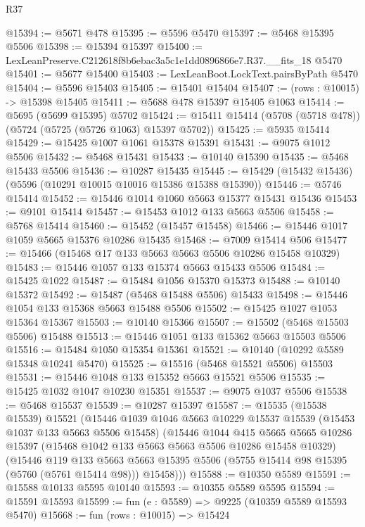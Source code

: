 \begin{lexlean}{R37}
\begin{coremodule}
@15394 := @5671 @478
@15395 := @5596 @5470
@15397 := @5468 @15395 @5506
@15398 := @15394 @15397
@15400 := LexLeanPreserve.C212618f8b6ebac3a5c1e1dd0896866e7.R37.__fits_18 @5470
@15401 := @5677 @15400
@15403 := LexLeanBoot.LockText.pairsByPath @5470
@15404 := @5596 @15403
@15405 := @15401 @15404
@15407 := (rows : @10015) -> @15398 @15405
@15411 := @5688 @478 @15397 @15405 @1063
@15414 := @5695 (@5699 @15395) @5702
@15424 := @15411 @15414 (@5708 (@5718 @478)) (@5724 (@5725 (@5726 @1063) @15397 @5702))
@15425 := @5935 @15414
@15429 := @15425 @1007 @1061 @15378 @15391
@15431 := @9075 @1012 @5506
@15432 := @5468 @15431
@15433 := @10140 @15390
@15435 := @5468 @15433 @5506
@15436 := @10287 @15435
@15445 := @15429 (@15432 @15436) (@5596 (@10291 @10015 @10016 @15386 @15388 @15390))
@15446 := @5746 @15414
@15452 := @15446 @1014 @1060 @5663 @15377 @15431 @15436
@15453 := @9101 @15414
@15457 := @15453 @1012 @133 @5663 @5506
@15458 := @5768 @15414
@15460 := @15452 (@15457 @15458)
@15466 := @15446 @1017 @1059 @5665 @15376 @10286 @15435
@15468 := @7009 @15414 @506
@15477 := @15466 (@15468 @17 @133 @5663 @5663 @5506 @10286 @15458 @10329)
@15483 := @15446 @1057 @133 @15374 @5663 @15433 @5506
@15484 := @15425 @1022
@15487 := @15484 @1056 @15370 @15373
@15488 := @10140 @15372
@15492 := @15487 (@5468 @15488 @5506) @15433
@15498 := @15446 @1054 @133 @15368 @5663 @15488 @5506
@15502 := @15425 @1027 @1053 @15364 @15367
@15503 := @10140 @15366
@15507 := @15502 (@5468 @15503 @5506) @15488
@15513 := @15446 @1051 @133 @15362 @5663 @15503 @5506
@15516 := @15484 @1050 @15354 @15361
@15521 := @10140 (@10292 @5589 @15348 @10241 @5470)
@15525 := @15516 (@5468 @15521 @5506) @15503
@15531 := @15446 @1048 @133 @15352 @5663 @15521 @5506
@15535 := @15425 @1032 @1047 @10230 @15351
@15537 := @9075 @1037 @5506
@15538 := @5468 @15537
@15539 := @10287 @15397
@15587 := @15535
    (@15538 @15539)
    @15521
    (@15446
      @1039
      @1046
      @5663
      @10229
      @15537
      @15539
      (@15453 @1037 @133 @5663 @5506 @15458)
      (@15446
        @1044
        @415
        @5665
        @5665
        @10286
        @15397
        (@15468 @1042 @133 @5663 @5663 @5506 @10286 @15458 @10329)
        (@15446
          @119
          @133
          @5663
          @5663
          @15395
          @5506
          (@5755 @15414 @98 @15395 (@5760 (@5761 @15414 @98)))
          @15458)))
@15588 := @10350 @5589
@15591 := @15588 @10133 @5595 @10140
@15593 := @10355 @5589 @5595
@15594 := @15591 @15593
@15599 := fun (e : @5589) => @9225 (@10359 @5589 @15593 @5470)
@15668 := fun (rows : @10015) =>
  @15424

\end{coremodule}
\end{lexlean}
